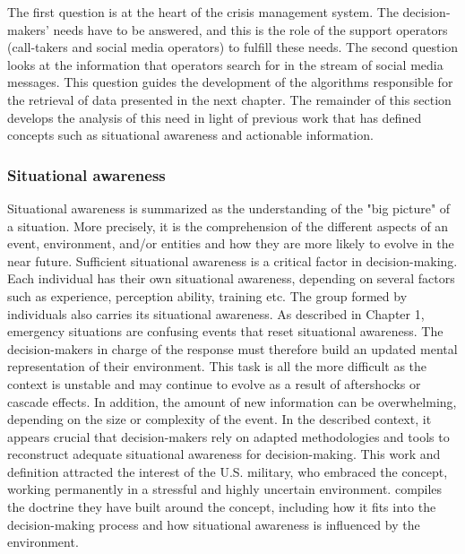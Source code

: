 The first question is at the heart of the crisis management system.
The decision-makers' needs have to be answered, and this is the role of the support operators (call-takers and social media operators) to fulfill these needs.
The second question looks at the information that operators search for in the stream of social media messages.
This question guides the development of the algorithms responsible for the retrieval of data presented in the next chapter.
The remainder of this section develops the analysis of this need in light of previous work that
has defined concepts such as situational awareness and actionable information.

\subsubsection{Situational awareness}
\label{sec:situational-awareness}
Situational awareness is summarized as the understanding of the "big picture" of a situation.
More precisely, it is the comprehension of the different aspects of an event, environment, and/or entities and how they are more likely to evolve in the near future.
Sufficient situational awareness is a critical factor in decision-making.
Each individual has their own situational awareness, depending on several factors such as experience, perception ability, training etc.
The group formed by individuals also carries its situational awareness.
As described in Chapter 1, emergency situations are confusing events that reset situational awareness.
The decision-makers in charge of the response must therefore build an updated mental representation of their environment.
This task is all the more difficult as the context is unstable and may continue to evolve as a result of aftershocks or cascade effects.
In addition, the amount of new information can be overwhelming, depending on the size or complexity of the event.
In the described context, it appears crucial that decision-makers rely on adapted methodologies and tools to reconstruct adequate situational awareness for decision-making.
This work and definition attracted the interest of the U.S. military, who embraced the concept, working permanently in a stressful and highly uncertain environment.
\textcite{departmentofthearmyAdvancedSituationalAwareness2021} compiles the doctrine they have built around the concept, including how it fits into the decision-making process and how situational awareness is influenced by the environment.

